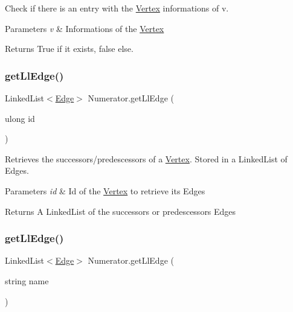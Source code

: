 Check if there is an entry with the \hyperlink{structVertex}{Vertex} informations of v. 


\begin{DoxyParams}{Parameters}
{\em v} & Informations of the \hyperlink{structVertex}{Vertex}\\
\hline
\end{DoxyParams}
\begin{DoxyReturn}{Returns}
True if it exists, false else.
\end{DoxyReturn}
\mbox{\label{classNumerator_ab43f0110fef2122e8ccd536b2650b895}} 
\subsubsection{\texorpdfstring{get\+Ll\+Edge()}{getLlEdge()}\hspace{0.1cm}{\footnotesize\ttfamily [1/3]}}
{\footnotesize\ttfamily Linked\+List$<$\hyperlink{classEdge}{Edge}$>$ Numerator.\+get\+Ll\+Edge (\begin{DoxyParamCaption}\item[{ulong}]{id }\end{DoxyParamCaption})\hspace{0.3cm}{\ttfamily [inline]}}



Retrieves the successors/predescessors of a \hyperlink{structVertex}{Vertex}. Stored in a Linked\+List of Edges. 


\begin{DoxyParams}{Parameters}
{\em id} & Id of the \hyperlink{structVertex}{Vertex} to retrieve its Edges\\
\hline
\end{DoxyParams}
\begin{DoxyReturn}{Returns}
A Linked\+List of the successors or predescessors Edges
\end{DoxyReturn}
\mbox{\label{classNumerator_aa604099f90d52d4add368caff4313707}} 
\subsubsection{\texorpdfstring{get\+Ll\+Edge()}{getLlEdge()}\hspace{0.1cm}{\footnotesize\ttfamily [2/3]}}
{\footnotesize\ttfamily Linked\+List$<$\hyperlink{classEdge}{Edge}$>$ Numerator.\+get\+Ll\+Edge (\begin{DoxyParamCaption}\item[{string}]{name }\end{DoxyParamCaption})\hspace{0.3cm}{\ttfamily [inline]}}



